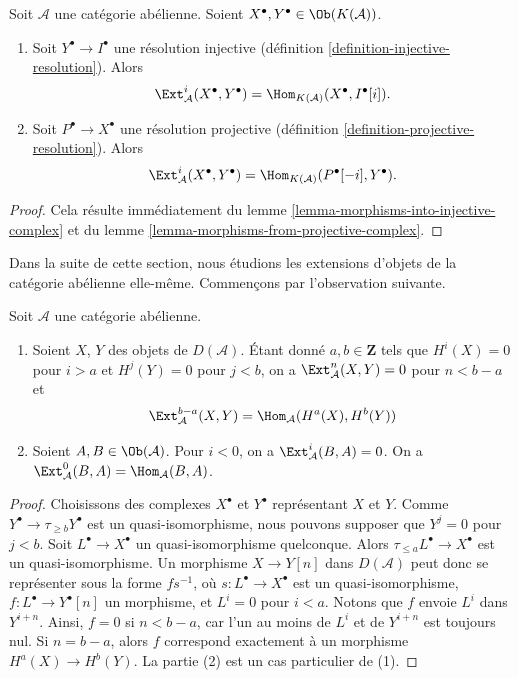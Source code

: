\begin{lemma}
\label{lemma-compute-ext-resolutions}
Soit $\mathcal{A}$ une catégorie abélienne.
Soient $X^\bullet, Y^\bullet \in \Ob(K(\mathcal{A}))$.
\begin{enumerate}
\item Soit $Y^\bullet \to I^\bullet$ une résolution injective
(définition \ref{definition-injective-resolution}). Alors
$$
\Ext^i_\mathcal{A}(X^\bullet, Y^\bullet) =
\Hom_{K(\mathcal{A})}(X^\bullet, I^\bullet[i]).
$$
\item Soit $P^\bullet \to X^\bullet$ une résolution projective
(définition \ref{definition-projective-resolution}). Alors
$$
\Ext^i_\mathcal{A}(X^\bullet, Y^\bullet) =
\Hom_{K(\mathcal{A})}(P^\bullet[-i], Y^\bullet).
$$
\end{enumerate}
\end{lemma}

\begin{proof}
Cela résulte immédiatement du
lemme \ref{lemma-morphisms-into-injective-complex} et du
lemme \ref{lemma-morphisms-from-projective-complex}.
\end{proof}

\noindent
Dans la suite de cette section, nous étudions les extensions d'objets de la
catégorie abélienne elle-même. Commençons par l'observation suivante.

\begin{lemma}
\label{lemma-negative-exts}
Soit $\mathcal{A}$ une catégorie abélienne.
\begin{enumerate}
\item Soient $X$, $Y$ des objets de $D(\mathcal{A})$. Étant donné
$a, b \in \mathbf{Z}$ tels que $H^i(X) = 0$ pour $i > a$ et
$H^j(Y) = 0$ pour $j < b$, on a
$\Ext^n_\mathcal{A}(X, Y) = 0$ pour $n < b - a$ et
$$
\Ext^{b - a}_\mathcal{A}(X, Y) = \Hom_\mathcal{A}(H^a(X), H^b(Y))
$$
\item Soient $A, B \in \Ob(\mathcal{A})$.
Pour $i < 0$, on a $\Ext^i_\mathcal{A}(B, A) = 0$.
On a $\Ext^0_\mathcal{A}(B, A) = \Hom_\mathcal{A}(B, A)$.
\end{enumerate}
\end{lemma}

\begin{proof}
Choisissons des complexes $X^\bullet$ et $Y^\bullet$ représentant $X$ et $Y$.
Comme $Y^\bullet \to \tau_{\geq b}Y^\bullet$ est un quasi-isomorphisme, nous
pouvons supposer que $Y^j = 0$ pour $j < b$.
Soit $L^\bullet \to X^\bullet$ un quasi-isomorphisme quelconque.
Alors $\tau_{\leq a}L^\bullet \to X^\bullet$ est un quasi-isomorphisme.
Un morphisme $X \to Y[n]$ dans $D(\mathcal{A})$ peut donc se représenter sous
la forme $fs^{-1}$, où $s : L^\bullet \to X^\bullet$ est un
quasi-isomorphisme, $f : L^\bullet \to Y^\bullet[n]$ un morphisme, et
$L^i = 0$ pour $i < a$. Notons que $f$ envoie $L^i$ dans $Y^{i + n}$.
Ainsi, $f = 0$ si $n < b - a$, car l'un au moins de $L^i$ et de
$Y^{i + n}$ est toujours nul. Si $n = b - a$, alors $f$ correspond exactement
à un morphisme $H^a(X) \to H^b(Y)$. La partie (2) est un cas particulier de
(1).
\end{proof}

